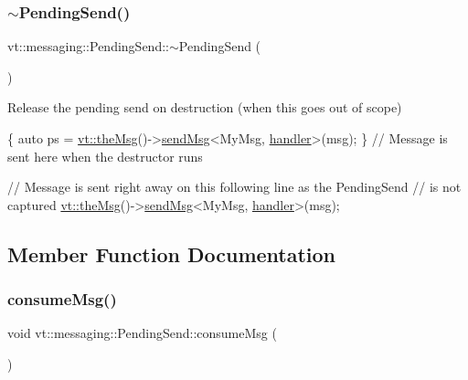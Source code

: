 \subsubsection{\texorpdfstring{$\sim$\+Pending\+Send()}{~PendingSend()}}
{\footnotesize\ttfamily vt\+::messaging\+::\+Pending\+Send\+::$\sim$\+Pending\+Send (\begin{DoxyParamCaption}{ }\end{DoxyParamCaption})\hspace{0.3cm}{\ttfamily [inline]}}



Release the pending send on destruction (when this goes out of scope) 


\begin{DoxyCode}
\{
  \textcolor{keyword}{auto} ps = \hyperlink{namespacevt_aeafd31f866aeb4dc6fc2f6ee97136350}{vt::theMsg}()->\hyperlink{group__preregister_ga0162a39473e7f9b490a79a7983d949ac}{sendMsg}<MyMsg, \hyperlink{namespacevt_1_1config_a6bd1d6215bda0d8ca02811798399f689a82a0081a94d5c5dfd18b0b3f7eca64b7}{handler}>(msg);
\} \textcolor{comment}{// Message is sent here when the destructor runs}

\textcolor{comment}{// Message is sent right away on this following line as the PendingSend}
\textcolor{comment}{// is not captured}
\hyperlink{namespacevt_aeafd31f866aeb4dc6fc2f6ee97136350}{vt::theMsg}()->\hyperlink{group__preregister_ga0162a39473e7f9b490a79a7983d949ac}{sendMsg}<MyMsg, \hyperlink{namespacevt_1_1config_a6bd1d6215bda0d8ca02811798399f689a82a0081a94d5c5dfd18b0b3f7eca64b7}{handler}>(msg);
\end{DoxyCode}
 

\subsection{Member Function Documentation}
\mbox{\label{structvt_1_1messaging_1_1_pending_send_a0f249a127a798ba0823fae82c925ed3b}} 
\subsubsection{\texorpdfstring{consume\+Msg()}{consumeMsg()}}
{\footnotesize\ttfamily void vt\+::messaging\+::\+Pending\+Send\+::consume\+Msg (\begin{DoxyParamCaption}{ }\end{DoxyParamCaption})\hspace{0.3cm}{\ttfamily [private]}}




